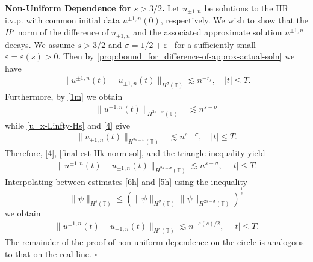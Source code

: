 \documentclass[12pt,reqno]{amsart}
\renewcommand{\qedsymbol}{\ensuremath{\square}}
\newcommand{\ci}{\mathbb{T}}
\newcommand{\ee}{\varepsilon}
\theoremstyle{plain}  %
\theoremstyle{definition}
\begin{document}
{\bf Non-Uniform Dependence for $s > 3/2$.}
%
%
%
Let $u_{\pm 1, n}$ be solutions to the HR i.v.p. with common initial data 
$u^{\pm 1,
n}(0)$, respectively.
We wish to show that the $H^s$ norm of the difference of $u_{\pm 1,
n}$ and the associated approximate solution $u^{\pm 1, n}$ decays.
We assume
$s > 3/2 $ and $\sigma = 1/2 + \ee$ \ for a sufficiently small
$\ee= \ee(s) > 0$. 
Then by \autoref{prop:bound_for_difference-of-approx-actual-soln} we 
have
%
%
\begin{equation}
\begin{split}
\|u^{\pm 1, n}(t) - u_{\pm 1, n} (t) \|_{H^\sigma (\ci)} \lesssim n^{-r_s}
\label{6h}, \quad |t| \le T.
\end{split}
\end{equation}
%
%
Furthermore, by \eqref{1m} we obtain
%
%
\begin{equation}
\begin{split}
\|u^{\pm 1, n} (t) \|_{H^{2s - \sigma} (\ci)}
& \lesssim n^{s-\sigma}
\label{4}
\end{split}
\end{equation}
%
%
while \eqref{u_x-Linfty-Hs} and \eqref{4} give
\begin{equation}
	\begin{split}
\|u_{\pm 1, n} (t) \|_{H^{2s - \sigma}(\ci)}
& \lesssim n^{s- \sigma}, \quad |t| \le T.
\label{final-est-Hk-norm-sol}
\end{split}
\end{equation}
%
%
%
%
%
%
%
Therefore, \eqref{4}, \eqref{final-est-Hk-norm-sol}, and the triangle
inequality yield
%
%
\begin{equation}
\begin{split}
\|u^{\pm 1, n} (t) - u_{\pm 1, n}(t)\|_{H^{2s - \sigma}(\ci)}
\lesssim n^{s-\sigma}, \quad |t| \le T.
\label{5h}
\end{split}
\end{equation}
%
%
%
%
Interpolating between estimates \eqref{6h} and \eqref{5h} using the 
inequality
%
\begin{equation*}
\|\psi \|_{H^s (\ci)} \leq  (\| \psi \|_{H^\sigma (\ci)} \| \psi
\|_{H^{2s-\sigma}(\ci)})^\frac12
\end{equation*}
%
%
we obtain
%
%
\begin{equation}
\begin{split}
\|u^{\pm 1,n}(t) - u_{\pm 1, n}(t) \|_{H^s (\ci)} \lesssim
n^{-\ee(s)/2}, \quad |t| \le T.
\label{10h}
\end{split}
\end{equation}
%
%
The remainder of the proof of non-uniform dependence on the circle is
analogous to that on the real line. \qquad \qedsymbol
%
%
%
%	
%
%
%
%
%
%
%
%
%
\end{document}
